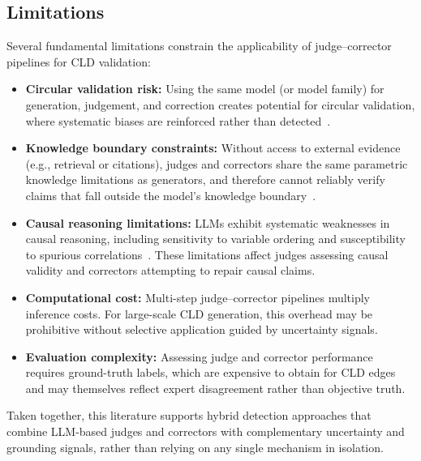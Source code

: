 \subsection{Limitations}

Several fundamental limitations constrain the applicability of judge--corrector pipelines for CLD validation:

\begin{itemize}
    \item \textbf{Circular validation risk:} Using the same model (or model family) for generation, judgement, and correction creates potential for circular validation, where systematic biases are reinforced rather than detected~\citep{li2024llmsjudges}.
    
    \item \textbf{Knowledge boundary constraints:} Without access to external evidence (e.g., retrieval or citations), judges and correctors share the same parametric knowledge limitations as generators, and therefore cannot reliably verify claims that fall outside the model's knowledge boundary~\citep{huang2025hallucination, kalai2025languagemodelshallucinate, xu2025hallucination}.
    
    \item \textbf{Causal reasoning limitations:} LLMs exhibit systematic weaknesses in causal reasoning, including sensitivity to variable ordering and susceptibility to spurious correlations~\citep{kiciman2024causal, joshi2024causalfallacies}. These limitations affect judges assessing causal validity and correctors attempting to repair causal claims.
    
    \item \textbf{Computational cost:} Multi-step judge--corrector pipelines multiply inference costs. For large-scale CLD generation, this overhead may be prohibitive without selective application guided by uncertainty signals.
    
    \item \textbf{Evaluation complexity:} Assessing judge and corrector performance requires ground-truth labels, which are expensive to obtain for CLD edges and may themselves reflect expert disagreement rather than objective truth.
\end{itemize}

Taken together, this literature supports hybrid detection approaches that combine LLM-based judges and correctors with complementary uncertainty and grounding signals, rather than relying on any single mechanism in isolation.






